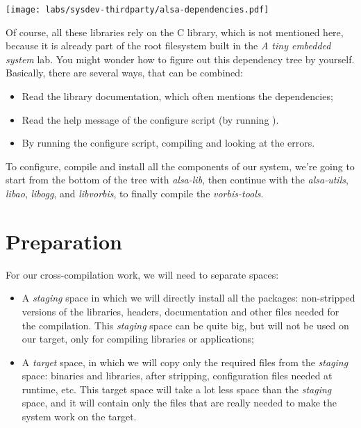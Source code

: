 \begin{center}
\texttt{[image: labs/sysdev-thirdparty/alsa-dependencies.pdf]}
\end{center}

Of course, all these libraries rely on the C library, which is not
mentioned here, because it is already part of the root filesystem
built in the {\em A tiny embedded system} lab. You might wonder how to
figure out this dependency tree by yourself. Basically, there are
several ways, that can be combined:

\begin{itemize}
\item Read the library documentation, which often mentions the
  dependencies;
\item Read the help message of the configure script (by running
  ).
\item By running the configure script, compiling and looking at the
  errors.
\end{itemize}

To configure, compile and install all the components of our system,
we're going to start from the bottom of the tree with {\em alsa-lib},
then continue with the {\em alsa-utils}, \emph{libao}, {\em libogg},
and \emph{libvorbis}, to finally compile the \emph{vorbis-tools}.

\section{Preparation}

For our cross-compilation work, we will need to separate spaces:
\begin{itemize}
\item A \emph{staging} space in which we will directly install all the
  packages: non-stripped versions of the libraries, headers,
  documentation and other files needed for the compilation. This
  \emph{staging} space can be quite big, but will not be used on our
  target, only for compiling libraries or applications;
\item A \emph{target} space, in which we will copy only the required
  files from the \emph{staging} space: binaries and libraries, after
  stripping, configuration files needed at runtime, etc. This target
  space will take a lot less space than the \emph{staging} space, and
  it will contain only the files that are really needed to make the
  system work on the target.
\end{itemize}

